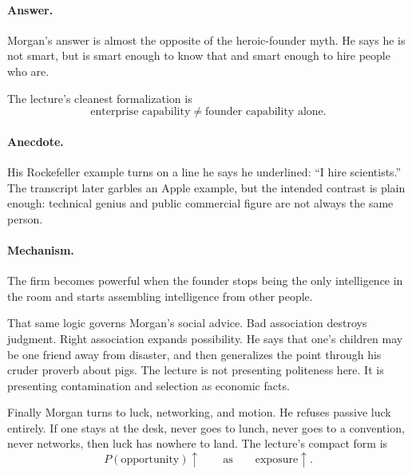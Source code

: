 \paragraph{Answer.}
Morgan's answer is almost the opposite of the heroic-founder myth. He says he is not smart, but is smart enough to know that and smart enough to hire people who are.

The lecture's cleanest formalization is
\begin{equation}
\text{enterprise capability} \neq \text{founder capability alone}.
\end{equation}

\paragraph{Anecdote.}
His Rockefeller example turns on a line he says he underlined: ``I hire scientists.'' The transcript later garbles an Apple example, but the intended contrast is plain enough: technical genius and public commercial figure are not always the same person.

\paragraph{Mechanism.}
The firm becomes powerful when the founder stops being the only intelligence in the room and starts assembling intelligence from other people.

That same logic governs Morgan's social advice. Bad association destroys judgment. Right association expands possibility. He says that one's children may be one friend away from disaster, and then generalizes the point through his cruder proverb about pigs. The lecture is not presenting politeness here. It is presenting contamination and selection as economic facts.

Finally Morgan turns to luck, networking, and motion. He refuses passive luck entirely. If one stays at the desk, never goes to lunch, never goes to a convention, never networks, then luck has nowhere to land. The lecture's compact form is
\begin{equation}
P(\text{opportunity}) \uparrow
\qquad \text{as} \qquad
\text{exposure} \uparrow .
\end{equation}

